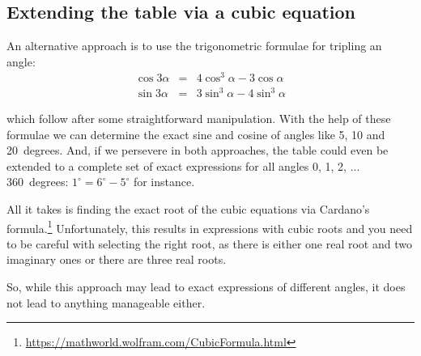 \documentclass[onecolumn]{article}
\begin{document}
\subsection*{Extending the table via a cubic equation}
An alternative approach is to use the trigonometric formulae for tripling an angle:
\begin{eqnarray*}
    \cos 3 \alpha &=& 4 \cos^3 \alpha - 3 \cos \alpha \\
    \sin 3 \alpha &=& 3 \sin^3 \alpha - 4 \sin^3 \alpha
\end{eqnarray*}

\noindent which follow after some straightforward manipulation. With the help of these formulae we can determine the exact sine and cosine of angles
like 5, 10 and 20~degrees. And, if we persevere in both approaches, the table could even be extended to a complete set of exact expressions for
all angles 0, 1, 2, ... 360~degrees: $1^\circ = 6^\circ - 5^\circ$ for instance.

All it takes is finding the exact root of the cubic equations via Cardano's formula.\footnote{\url{https://mathworld.wolfram.com/CubicFormula.html}}
Unfortunately, this results in expressions with cubic roots and you need to be careful with selecting the right root, as there is either one real root and
two imaginary ones or there are three real roots.

So, while this approach may lead to exact expressions of different angles, it does not lead to anything manageable either.
\end{document}
